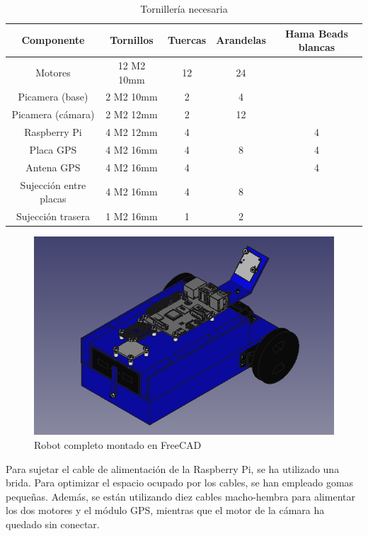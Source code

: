 \begin{table}[H]
	\begin{center}
		\begin{tabular}{|c|c|c|c|c|}
			\hline
			Componente & Tornillos & Tuercas & Arandelas & Hama Beads blancas\\
			\hline
			Motores & 12 M2 10mm & 12 & 24 &\\
			\hline
			Picamera (base) & 2 M2 10mm & 2 & 4 &\\
			\hline
			Picamera (cámara) & 2 M2 12mm & 2 & 12 &\\
			\hline
			Raspberry Pi & 4 M2 12mm & 4 & & 4\\
			\hline
			Placa GPS & 4 M2 16mm & 4 & 8 & 4\\
			\hline
			Antena GPS & 4 M2 16mm & 4 & & 4\\
			\hline
			Sujección entre placas & 4 M2 16mm & 4 & 8 &\\
			\hline
			Sujección trasera & 1 M2 16mm & 1 & 2 &\\
			\hline
		\end{tabular}
		\caption{Tornillería necesaria}
		\label{cuadro:tornillos}
	\end{center}
\end{table}

\begin{figure} [h!]
	\begin{center}
		\includegraphics[width=12cm]{figs/cap5/completo3.png}
	\end{center}
	\caption{Robot completo montado en FreeCAD} 
	\label{fig:robotfreecad}
\end{figure}


Para sujetar el cable de alimentación de la Raspberry Pi, se ha utilizado una brida. Para optimizar el espacio ocupado por los cables, se han empleado gomas pequeñas. Además, se están utilizando diez cables macho-hembra para alimentar los dos motores y el módulo GPS, mientras que el motor de la cámara ha quedado sin conectar.

